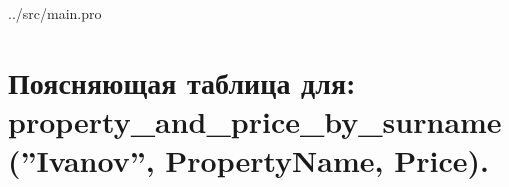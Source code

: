 
\begin{lstinputlisting}[
	caption={Листинг программы},
	label={lst:t1},
	linerange={1-108},
	]{../src/main.pro}
\end{lstinputlisting}

\section*{Поясняющая таблица для: \newline property\_and\_price\_by\_surname(''Ivanov'', PropertyName, Price).}

